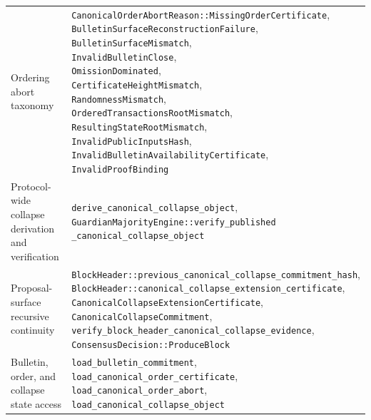 \documentclass[11pt]{article}
\newcommand{\code}[1]{\texttt{#1}}
\begin{document}
\begin{center}
\begin{tabularx}{\textwidth}{>{\raggedright\arraybackslash}p{} X}
Ordering abort taxonomy & \shortstack[l]{\code{CanonicalOrderAbortReason::MissingOrderCertificate},\\\code{BulletinSurfaceReconstructionFailure},\\\code{BulletinSurfaceMismatch},\\\code{InvalidBulletinClose},\\\code{OmissionDominated},\\\code{CertificateHeightMismatch},\\\code{RandomnessMismatch},\\\code{OrderedTransactionsRootMismatch},\\\code{ResultingStateRootMismatch},\\\code{InvalidPublicInputsHash},\\\code{InvalidBulletinAvailabilityCertificate},\\\code{InvalidProofBinding}} \\
Protocol-wide collapse derivation and verification & \shortstack[l]{\code{derive\_canonical\_collapse\_object},\\\code{GuardianMajorityEngine::verify\_published}\\\code{\_canonical\_collapse\_object}} \\
Proposal-surface recursive continuity & \shortstack[l]{\code{BlockHeader::previous\_canonical\_collapse\_commitment\_hash},\\\code{BlockHeader::canonical\_collapse\_extension\_certificate},\\\code{CanonicalCollapseExtensionCertificate},\\\code{CanonicalCollapseCommitment},\\\code{verify\_block\_header\_canonical\_collapse\_evidence},\\\code{ConsensusDecision::ProduceBlock}} \\
Bulletin, order, and collapse state access & \shortstack[l]{\code{load\_bulletin\_commitment},\\\code{load\_canonical\_order\_certificate},\\\code{load\_canonical\_order\_abort},\\\code{load\_canonical\_collapse\_object}} \\

\end{tabularx}
\end{center}
\end{document}
